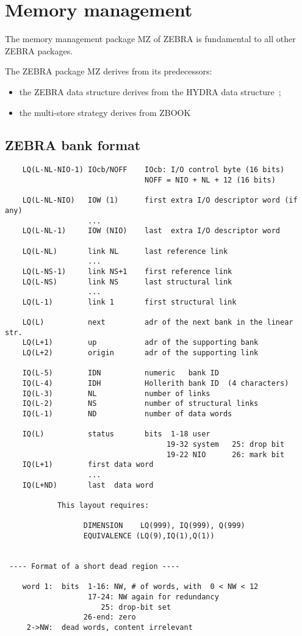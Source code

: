 \chapter{Memory management}
\label{sec:H1-MZ-memory-management}

The memory management package MZ of ZEBRA is fundamental
to all other ZEBRA packages.

The ZEBRA package MZ derives from its predecessors:

\begin{itemize}
\item the ZEBRA data structure derives from the HYDRA data structure~\cite{bib-HYDRAMZ};
\item the multi-store strategy derives from ZBOOK~\cite{bib-ZBOOK}
\end{itemize}

\section{ZEBRA bank format}

\begin{verbatim}
    LQ(L-NL-NIO-1) IOcb/NOFF    IOcb: I/O control byte (16 bits)
                                NOFF = NIO + NL + 12 (16 bits)

    LQ(L-NL-NIO)   IOW (1)      first extra I/O descriptor word (if any)
                   ...
    LQ(L-NL-1)     IOW (NIO)    last  extra I/O descriptor word

    LQ(L-NL)       link NL      last reference link
                   ...
    LQ(L-NS-1)     link NS+1    first reference link
    LQ(L-NS)       link NS      last structural link
                   ...
    LQ(L-1)        link 1       first structural link

    LQ(L)          next         adr of the next bank in the linear str.
    LQ(L+1)        up           adr of the supporting bank
    LQ(L+2)        origin       adr of the supporting link

    IQ(L-5)        IDN          numeric   bank ID
    IQ(L-4)        IDH          Hollerith bank ID  (4 characters)
    IQ(L-3)        NL           number of links
    IQ(L-2)        NS           number of structural links
    IQ(L-1)        ND           number of data words

    IQ(L)          status       bits  1-18 user
                                     19-32 system   25: drop bit
                                     19-22 NIO      26: mark bit
    IQ(L+1)        first data word
                   ...
    IQ(L+ND)       last  data word

            This layout requires:

                  DIMENSION    LQ(999), IQ(999), Q(999)
                  EQUIVALENCE (LQ(9),IQ(1),Q(1))


 ---- Format of a short dead region ----

    word 1:  bits  1-16: NW, # of words, with  0 < NW < 12
                   17-24: NW again for redundancy
                      25: drop-bit set
                  26-end: zero
     2->NW:  dead words, content irrelevant
\end{verbatim} 


